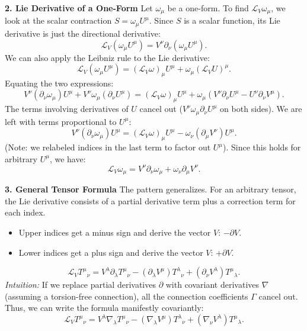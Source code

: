 \documentclass[11pt, a4paper]{report}
\begin{document}
\textbf{2. Lie Derivative of a One-Form}
Let $\omega_\mu$ be a one-form. To find $\mathcal{L}_V \omega_\mu$, we look at the scalar contraction $S = \omega_\mu U^\mu$.
Since $S$ is a scalar function, its Lie derivative is just the directional derivative:
\begin{equation}
\mathcal{L}_V (\omega_\mu U^\mu) = V^\nu \partial_\nu (\omega_\mu U^\mu).
\end{equation}
We can also apply the Leibniz rule to the Lie derivative:
\begin{equation}
\mathcal{L}_V (\omega_\mu U^\mu) = (\mathcal{L}_V \omega)_\mu U^\mu + \omega_\mu (\mathcal{L}_V U)^\mu.
\end{equation}
Equating the two expressions:
\begin{equation}
V^\nu (\partial_\nu \omega_\mu) U^\mu + V^\nu \omega_\mu (\partial_\nu U^\mu) = (\mathcal{L}_V \omega)_\mu U^\mu + \omega_\mu (V^\nu \partial_\nu U^\mu - U^\nu \partial_\nu V^\mu).
\end{equation}
The terms involving derivatives of $U$ cancel out ($V^\nu \omega_\mu \partial_\nu U^\mu$ on both sides). We are left with terms proportional to $U^\mu$:
\begin{equation}
V^\nu (\partial_\nu \omega_\mu) U^\mu = (\mathcal{L}_V \omega)_\mu U^\mu - \omega_\nu (\partial_\mu V^\nu) U^\mu.
\end{equation}
(Note: we relabeled indices in the last term to factor out $U^\mu$). Since this holds for arbitrary $U^\mu$, we have:
\begin{equation}
\mathcal{L}_V \omega_\mu = V^\nu \partial_\nu \omega_\mu + \omega_\nu \partial_\mu V^\nu.
\end{equation}

\textbf{3. General Tensor Formula}
The pattern generalizes. For an arbitrary tensor, the Lie derivative consists of a partial derivative term plus a correction term for each index.
\begin{itemize}
    \item Upper indices get a minus sign and derive the vector $V$: $-\partial V$.
    \item Lower indices get a plus sign and derive the vector $V$: $+\partial V$.
\end{itemize}
\begin{equation}
\mathcal{L}_V {T^\mu}_\nu = V^\lambda \partial_\lambda {T^\mu}_\nu - (\partial_\lambda V^\mu) {T^\lambda}_\nu + (\partial_\nu V^\lambda) {T^\mu}_\lambda.
\end{equation}
\textit{Intuition:} If we replace partial derivatives $\partial$ with covariant derivatives $\nabla$ (assuming a torsion-free connection), all the connection coefficients $\Gamma$ cancel out. Thus, we can write the formula manifestly covariantly:
\begin{equation}
\mathcal{L}_V {T^\mu}_\nu = V^\lambda \nabla_\lambda {T^\mu}_\nu - (\nabla_\lambda V^\mu) {T^\lambda}_\nu + (\nabla_\nu V^\lambda) {T^\mu}_\lambda.
\end{equation}
\end{document}
